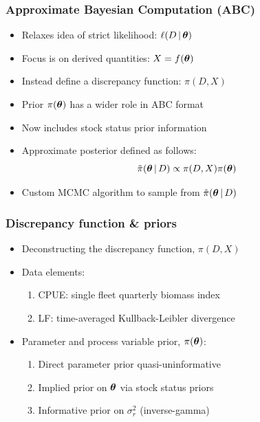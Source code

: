 \documentclass{beamer}
\newcommand{\ds}{\displaystyle}
\newcommand{\xtheta}{\mbox{\boldmath$\theta$}}
\newcommand{\sigr}{\sigma^2_r}
\begin{document}
\begin{frame}
    \frametitle{Approximate Bayesian Computation (ABC)}
\begin{itemize}
    \item Relaxes idea of strict likelihood: $\ell(D\,|\,\xtheta)$
    \item Focus is on derived quantities: $X=f(\xtheta)$
    \item Instead define a discrepancy function: $\pi(D,X)$
    \item Prior $\pi(\xtheta)$ has a wider role in ABC format
    \item Now includes stock status prior information
    \item Approximate posterior defined as follows:
        \begin{equation*}
            \ds \tilde\pi(\xtheta\,|\,D)\propto \pi(D,X)\pi(\xtheta)
        \end{equation*}
    \item Custom MCMC algorithm to sample from $\tilde\pi(\xtheta\,|\,D)$
\end{itemize}
\end{frame}

\begin{frame}
    \frametitle{Discrepancy function \& priors}
\begin{itemize}
    \item Deconstructing the discrepancy function, $\pi(D,X)$
    \item Data elements:
        \vspace{0.2cm}
        \begin{enumerate}
            \item CPUE: single fleet quarterly biomass index
            \item LF: time-averaged Kullback-Leibler divergence 
        \end{enumerate}
        \vspace{0.2cm}
    \item Parameter and process variable prior, $\pi(\xtheta)$:
        \vspace{0.2cm} 
        \begin{enumerate}
            \item Direct parameter prior quasi-uninformative
            \item Implied prior on $\xtheta$ via stock status priors
            \item Informative prior on $\sigr$ (inverse-gamma)
        \end{enumerate} 
\end{itemize}
\end{frame}
\end{document}
